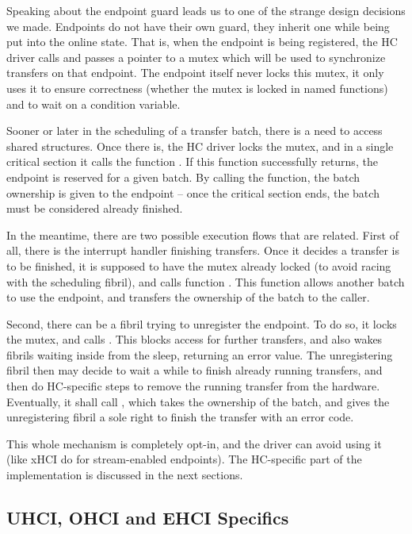 Speaking about the endpoint guard leads us to one of the strange design
decisions we made. Endpoints do not have their own guard, they inherit one
while being put into the online state. That is, when the endpoint is being
registered, the HC driver calls  and passes a pointer
to a mutex which will be used to synchronize transfers on that endpoint. The
endpoint itself never locks this mutex, it only uses it to ensure correctness
(whether the mutex is locked in named functions) and to wait on a condition
variable.

Sooner or later in the scheduling of a transfer batch, there is a need to access
shared structures. Once there is, the HC driver locks the mutex, and in a single
critical section it calls the function . If this
function successfully returns, the endpoint is reserved for a given batch. By
calling the function, the batch ownership is given to the endpoint -- once the
critical section ends, the batch must be considered already finished.

In the meantime, there are two possible execution flows that are related. First
of all, there is the interrupt handler finishing transfers. Once it decides
a transfer is to be finished, it is supposed to have the mutex already locked
(to avoid racing with the scheduling fibril), and calls function
. This function allows another batch to use the
endpoint, and transfers the ownership of the batch to the caller.

Second, there can be a fibril trying to unregister the endpoint. To do so, it
locks the mutex, and calls . This blocks access for
further transfers, and also wakes fibrils waiting inside
 from the sleep, returning an error value. The
unregistering fibril then may decide to wait a while to finish already running
transfers, and then do HC-specific steps to remove the running transfer from the
hardware. Eventually, it shall call , which
takes the ownership of the batch, and gives the unregistering fibril a sole
right to finish the transfer with an error code.

This whole mechanism is completely opt-in, and the driver can avoid using it
(like xHCI do for stream-enabled endpoints). The HC-specific part of the
implementation is discussed in the next sections.

\subsection{UHCI, OHCI and EHCI Specifics}

